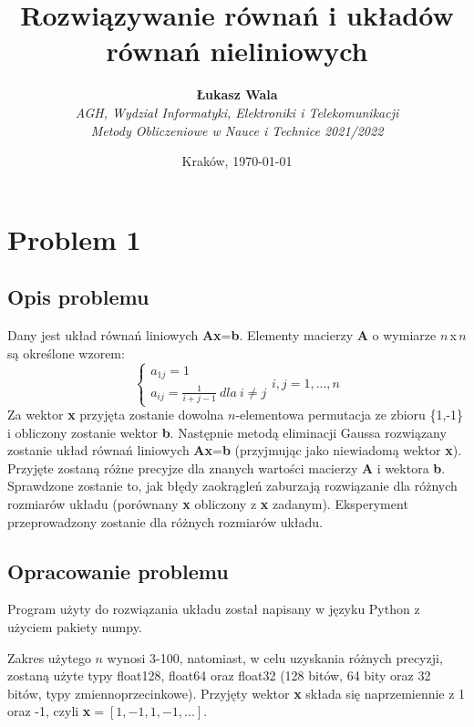 \documentclass{article}
\title{Rozwiązywanie równań i układów równań nieliniowych}
\author{\textbf{Łukasz Wala}\\
    \textit{AGH, Wydział Informatyki, Elektroniki i Telekomunikacji} \\
    \textit{Metody Obliczeniowe w Nauce i Technice 2021/2022}}
\date{Kraków, \today}
\begin{document}
\maketitle

\section{Problem 1}
\subsection{Opis problemu}
Dany jest układ równań liniowych \textbf{Ax}=\textbf{b}.
Elementy macierzy \textbf{A} o wymiarze $n$\,x\,$n$ są określone wzorem:
$$
\begin{cases}
    a_{1j}=1\\
    a_{ij}=\frac{1}{i+j-1} \ dla \ i \ne j
\end{cases}i,j=1,...,n
$$
Za wektor \textbf{x} przyjęta zostanie dowolna $n$-elementowa permutacja ze zbioru \{1,-1\} i obliczony zostanie
wektor \textbf{b}. Następnie metodą eliminacji Gaussa rozwiązany zostanie układ równań liniowych \textbf{Ax}=\textbf{b}
(przyjmując jako niewiadomą wektor \textbf{x}). Przyjęte zostaną różne precyjze dla znanych wartości macierzy \textbf{A} i
wektora \textbf{b}. Sprawdzone zostanie to, jak błędy zaokrągleń zaburzają rozwiązanie dla różnych rozmiarów układu
(porównany \textbf{x} obliczony z \textbf{x} zadanym). Eksperyment przeprowadzony zostanie dla różnych rozmiarów układu.

\subsection{Opracowanie problemu}
Program użyty do rozwiązania układu został napisany w języku Python z użyciem pakiety numpy.

Zakres użytego $n$ wynosi 3-100, natomiast, w celu uzyskania różnych precyzji, zostaną użyte typy float128, float64 oraz float32
(128 bitów, 64 bity oraz 32 bitów, typy zmiennoprzecinkowe). Przyjęty wektor \textbf{x} składa się naprzemiennie z 1 oraz -1, czyli
\textbf{x}$=[1,-1,1,-1,...]$.
\end{document}

